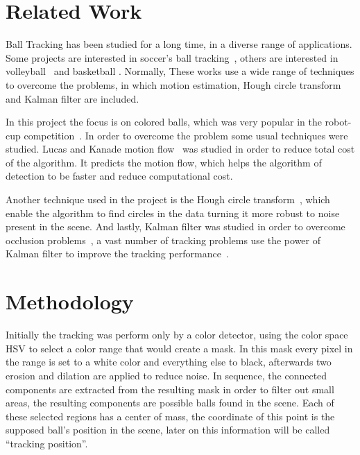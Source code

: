 \documentclass[10pt,twocolumn,letterpaper]{article}
\begin{document}
\section{Related Work}\label{sec:work}

Ball Tracking has been studied for a long time, in a diverse range of applications.  Some projects  are interested in soccer's ball tracking~\cite{seo1997ball,  tong2004effective, choi2004probabilistic}, others are interested in  volleyball~\cite{chen2007physics} and basketball \cite{ maksai2016players}.   Normally, These works use a wide range of techniques to overcome the problems,  in which motion estimation, Hough circle transform and Kalman filter are included.

In this project the focus is on colored balls, which was very popular in the robot-cup competition~\cite{kitano1997robocup, simon2000robust, kitano1998robocup}.  In order to overcome the problem some usual techniques were studied. Lucas and Kanade motion flow~\cite{tomasi1992shape, tomasi1991detection} was studied in order to reduce total cost of the algorithm.  It predicts the motion flow, which helps the algorithm of detection to be faster and reduce computational cost.

Another technique used in the project is the Hough circle
transform~\cite{illingworth1987adaptive}, which enable  the algorithm to find
circles in the data turning it more robust to noise present in the scene. And
lastly, Kalman filter was studied in order to overcome occlusion problems~\cite{ristic2004beyond}, a vast number of tracking problems use the power of Kalman filter to improve the tracking performance~\cite{satoh2004color}.


\section{Methodology}\label{sec:method}

Initially the tracking was perform only by a color detector, using the color space HSV to select a color range that would create a mask. In this mask every pixel in the range is set to a white color and everything else to black, afterwards two erosion and dilation are applied to reduce noise. In sequence, the connected components are extracted from the resulting mask in order to filter out small areas, the resulting components are possible balls found in the scene. Each of these selected regions has a center of mass, the coordinate of this point is the supposed ball's position in the scene, later on this information will be called ``tracking position''.
\end{document}

